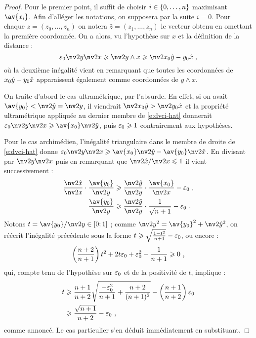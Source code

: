 \begin{proof}
  Pour le premier point, il suffit de choisir \( i \in \lbrace 0, \dots, n \rbrace \)
  maximisant \( \av{x_i} \). Afin d'alléger les notations, on supposera par
  la suite \( i = 0 \). Pour chaque \( z = (z_0, \dots, z_n) \) on notera \(
    \hat{z} = (z_1, \dots, z_n) \) le vecteur obtenu en omettant la première
  coordonnée. On a alors, vu l'hypothèse sur \( x \) et la définition de la
  distance :
  \begin{equation} \label{e:dvci-hat}
    \eps_0 \nv2 y \nv2 x
    \ge
    \nv2{y \wedge x}
    \ge
    \nv2{x_0 \hatys - y_0 \hatxs}
    \pmm,
  \end{equation}
  où la deuxième inégalité vient en remarquant que toutes les coordonnées de
  \( x_0 \smash{\hat y} - y_0 \smash{\hat x} \) apparaissent également comme coordonnées de \(
    y \wedge x \).

  On traite d'abord le cas ultramétrique, par l'absurde. En effet, si on avait
  \( \av{y_0} < \nv2{\hatys} = \nv2{y} \), il viendrait \( \nv2{x_0 \hatys} >
    \nv2{y_0 \hatxs} \) et la propriété ultramétrique appliquée au dernier
  membre de \eqref{e:dvci-hat} donnerait \( \eps_0 \nv2{y}\nv2{x}  \ge
    \av{x_0}\nv2{\hatys} \), puis \( \varepsilon_0 \geqslant 1 \) contrairement aux
  hypothèses.

  Pour le cas archimédien, l'inégalité triangulaire dans le membre de droite
  de \eqref{e:dvci-hat} donne
  \( \eps_0 \nv2{y}\nv2{x}  \ge \av{x_0}\nv2{\hatys} - \av{y_0}\nv2{\hatxs}
  \).  En divisant par \( \nv2{y}\nv2{x} \) puis en remarquant que \(
    \nv2{\hatxs}/\nv2{x} \le 1 \) il vient successivement :
  \begin{align}
    \frac{\nv2{\hatxs}}{\nv2{x}}
    \cdot \frac{\av{y_0}}{\nv2{y}}
    & \ge
    \frac{\nv2{\hatys}}{\nv2{y}}
    \cdot \frac{\av{x_0}}{\nv2{x}}
    - \eps_0
    \pmm, \notag
    \\
    \frac{\av{y_0}}{\nv2{y}}
    & \ge
    \frac{\nv2{\hatys}}{\nv2{y}}
    \cdot
    \frac{1}{\sqrt{n+1}}
    - \eps_0
    \pmm.
  \end{align}
  Notons \( t = \av{y_0}/\nv2{y} \in [0; 1] \) ; comme \( \nv2{y}^2 =
    \av{y_0}^2 + \nv2{\hatys}^2 \), on réécrit l'inégalité précédente sous
  la forme \( t \geqslant \sqrt{\frac{1-t^2}{n+1}}-\varepsilon_0 \), ou encore :
  \begin{equation}
    \left( \frac{n+2}{n+1} \right) t^2
    + 2t\varepsilon_0
    + \varepsilon_0^2
    - \frac{1}{n+1}
    \geqslant
    0
    \text{ ,}
  \end{equation}
  qui, compte tenu de l'hypothèse sur \( \varepsilon_0 \) et de la positivité de \( t
  \), implique :
  \begin{align*}
    t
    & \geqslant
    \frac{n+1}{n+2}
    \sqrt{ \frac{-\varepsilon_0^2}{n+1}+\frac{n+2}{(n+1)^2} }
    - \left( \frac{n+1}{n+2} \right) \varepsilon_0
    \\ & \geqslant
    \frac{\sqrt{n+1}}{n+2} - \varepsilon_0
    \text{ ,}
  \end{align*}
  comme annoncé. Le cas particulier s'en déduit immédiatement en substituant.
\end{proof}

